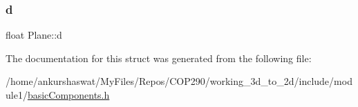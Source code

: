 \subsubsection{\texorpdfstring{d}{d}}
{\footnotesize\ttfamily float Plane\+::d}



The documentation for this struct was generated from the following file\+:\begin{DoxyCompactItemize}
\item 
/home/ankurshaswat/\+My\+Files/\+Repos/\+C\+O\+P290/working\+\_\+3d\+\_\+to\+\_\+2d/include/module1/\hyperlink{basicComponents_8h}{basic\+Components.\+h}\end{DoxyCompactItemize}
